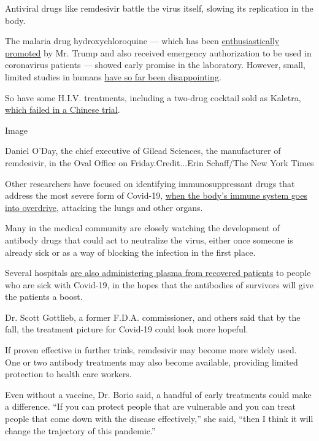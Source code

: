 Antiviral drugs like remdesivir battle the virus itself, slowing its
replication in the body.

The malaria drug hydroxychloroquine --- which has been
\href{https://www.nytimes3xbfgragh.onion/2020/04/06/us/politics/coronavirus-trump-malaria-drug.html}{enthusiastically
promoted} by Mr. Trump and also received emergency authorization to be
used in coronavirus patients --- showed early promise in the laboratory.
However, small, limited studies in humans
\href{https://www.nytimes3xbfgragh.onion/2020/04/24/health/fda-hydroxychloroquine-coronavirus.html}{have
so far been disappointing}.

So have some H.I.V. treatments, including a two-drug cocktail sold as
Kaletra,
\href{https://www.nytimes3xbfgragh.onion/2020/03/18/health/coronavirus-antiviral-drugs-fail.html}{which
failed in a Chinese trial}.

Image

Daniel O'Day, the chief executive of Gilead Sciences, the manufacturer
of remdesivir, in the Oval Office on Friday.Credit...Erin Schaff/The New
York Times

Other researchers have focused on identifying immunosuppressant drugs
that address the most severe form of Covid-19,
\href{https://www.nytimes3xbfgragh.onion/2020/04/01/health/coronavirus-cytokine-storm-immune-system.html}{when
the body's immune system goes into overdrive}, attacking the lungs and
other organs.

Many in the medical community are closely watching the development of
antibody drugs that could act to neutralize the virus, either once
someone is already sick or as a way of blocking the infection in the
first place.

Several hospitals
\href{https://slack-redir.net/link?url=https\%3A\%2F\%2Fwww.nytimes3xbfgragh.onion\%2F2020\%2F03\%2F26\%2Fhealth\%2Fplasma-coronavirus-treatment.html}{are
also administering plasma from recovered patients} to people who are
sick with Covid-19, in the hopes that the antibodies of survivors will
give the patients a boost.

Dr. Scott Gottlieb, a former F.D.A. commissioner, and others said that
by the fall, the treatment picture for Covid-19 could look more hopeful.

If proven effective in further trials, remdesivir may become more widely
used. One or two antibody treatments may also become available,
providing limited protection to health care workers.

Even without a vaccine, Dr. Borio said, a handful of early treatments
could make a difference. ``If you can protect people that are vulnerable
and you can treat people that come down with the disease effectively,''
she said, ``then I think it will change the trajectory of this
pandemic.''

